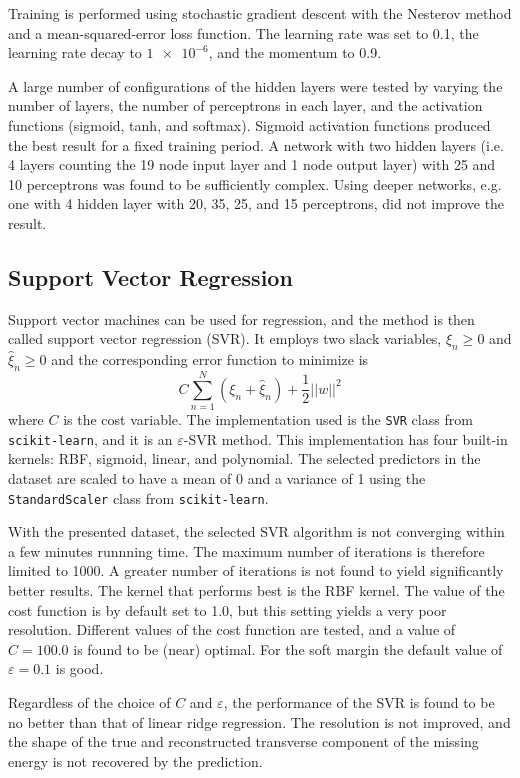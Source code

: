 \documentclass[twocolumn]{scrartcl}
\begin{document}
Training is performed using stochastic gradient descent with the Nesterov method \cite{nesterov} and a mean-squared-error loss function. The learning rate was set to 0.1, the learning rate decay to $\num{1e-6}$, and the momentum to 0.9.

A large number of configurations of the hidden layers were tested by varying the number of layers, the number of perceptrons in each layer, and the activation functions (sigmoid, tanh, and softmax). Sigmoid activation functions produced the best result for a fixed training period. A network with two hidden layers (i.e. 4 layers counting the 19 node input layer and 1 node output layer) with 25 and 10 perceptrons was found to be sufficiently complex. Using deeper networks, e.g. one with 4 hidden layer with 20, 35, 25, and 15 perceptrons, did not improve the result.

\subsection{Support Vector Regression}

Support vector machines can be used for regression, and the method is then called support vector regression (SVR). It employs two slack variables, $ξ_n ≥ 0$ and $\hat{ξ}_n ≥ 0$ and the corresponding error function to minimize is
\[
  C \sum_{n=1}^N(ξ_n + \hat{ξ}_n) + \frac{1}{2}||w||^2
\]
where $C$ is the cost variable. The implementation used is the \texttt{SVR} class from \texttt{scikit-learn}, and it is an $ε$-SVR method. This implementation has four built-in kernels: RBF, sigmoid, linear, and polynomial. The selected predictors in the dataset are scaled to have a mean of 0 and a variance of 1 using the \texttt{StandardScaler} class from \texttt{scikit-learn}.

With the presented dataset, the selected SVR algorithm is not converging within a few minutes runnning time. The maximum number of iterations is therefore limited to 1000. A greater number of iterations is not found to yield significantly better results. The kernel that performs best is the RBF kernel. The value of the cost function is by default set to 1.0, but this setting yields a very poor resolution. Different values of the cost function are tested, and a value of $C=100.0$ is found to be (near) optimal. For the soft margin the default value of $ε=0.1$ is good.

Regardless of the choice of $C$ and $ε$, the performance of the SVR is found to be no better than that of linear ridge regression. The resolution is not improved, and the shape of the true and reconstructed transverse component of the missing energy is not recovered by the prediction.
\end{document}
